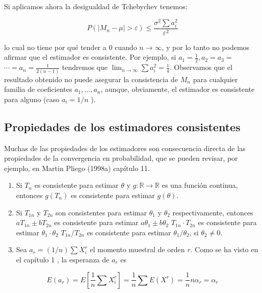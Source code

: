 \documentclass[
]{article}
\providecommand{\tightlist}{%
  \setlength{\itemsep}{0pt}\setlength{\parskip}{0pt}}
\begin{document}
Si aplicamos ahora la desigualdad de Tchebychev tenemos:

\[
P\left(\left|M_{n}-\mu\right|>\varepsilon\right) \leq \frac{\sigma^{2} \sum a_{i}^{2}}{\varepsilon^{2}}
\]

lo cual no tiene por qué tender a 0 cuando \(n \rightarrow \infty\), y por lo tanto no podemos afirmar que el estimador es consistente. Por ejemplo, si \(a_{1}=\frac{1}{2}, a_{2}=a_{3}=\) \(\cdots=a_{n}=\frac{1}{2(n-1)}\) tendremos que \(\lim _{n \rightarrow \infty} \sum a_{i}^{2}=\frac{1}{4}\).
Observamos que el resultado obtenido no puede asegurar la consistencia de \(M_{n}\) para cualquier familia de coeficientes \(a_{1}, \ldots, a_{n}\), aunque, obviamente, el estimador es consistente para alguno (caso \(a_{i}=1 / n\) ).

\subsection{Propiedades de los estimadores consistentes}\label{propiedades-de-los-estimadores-consistentes}

Muchas de las propiedades de los estimadores son consecuencia directa de las propiedades de la convergencia en probabilidad, que se pueden revisar, por ejemplo, en Martin Pliego (1998a) capítulo 11.

\begin{enumerate}
\def\labelenumi{\arabic{enumi}.}
\tightlist
\item
  Si \(T_{n}\) es consistente para estimar \(\theta\) y \(g: \mathbb{R} \rightarrow \mathbb{R}\) es una función continua, entonces \(g\left(T_{n}\right)\) es consistente para estimar \(g(\theta)\).
\item
  Si \(T_{1 n}\) y \(T_{2 n}\) son consistentes para estimar \(\theta_{1}\) y \(\theta_{2}\) respectivamente, entonces
  \(a T_{1 n} \pm b T_{2 n}\) es consistente para estimar \(a \theta_{1} \pm b \theta_{2}\)
  \(T_{1 n} \cdot T_{2 n}\) es consistente para estimar \(\theta_{1} \cdot \theta_{2}\)
  \(T_{1 n} / T_{2 n}\) es consistente para estimar \(\theta_{1} / \theta_{2}\), si \(\theta_{2} \neq 0\).
\item
  Sea \(a_{r}=(1 / n) \sum X_{i}^{r}\) el momento muestral de orden \(r\). Como se ha visto en el capítulo 1 , la esperanza de \(a_{r}\) es
\end{enumerate}

\[
E\left(a_{r}\right)=E\left[\frac{1}{n} \sum X_{i}^{r}\right]=\frac{1}{n} \sum E\left(X^{r}\right)=\frac{1}{n} n \alpha_{r}=\alpha_{r}
\]
\end{document}
